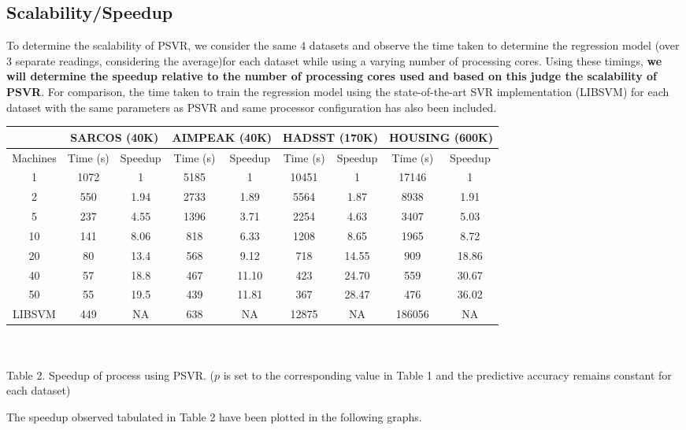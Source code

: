 \documentclass[12pt]{article}
\begin{document}
\subsection{Scalability/Speedup}
\label{Scalability/Speedup}
To determine the scalability of PSVR, we consider the same 4 datasets and observe the time taken to determine the regression model (over 3 separate readings, considering the average)for each dataset while using a varying number of processing cores. Using these timings, {\bf we will determine the speedup relative to the number of processing cores used and based on this judge the scalability of PSVR}. For comparison, the time taken to train the regression model using the state-of-the-art SVR implementation (LIBSVM) for each dataset with the same parameters as PSVR and same processor configuration has also been included. 
\begin{center}
\begin{tabular}{ |c|c|c|c|c|c|c|c|c| }
  \hline
   &  \multicolumn{2}{|c|}{SARCOS (40K)} &  \multicolumn{2}{|c|}{AIMPEAK (40K)} & \multicolumn{2}{|c|}{HADSST (170K)}  &  \multicolumn{2}{|c|}{HOUSING (600K)} \\
  \hline
  Machines & Time (s) & Speedup & Time (s) & Speedup & Time (s) & Speedup & Time (s) & Speedup\\
  \hline
  1 & 1072& 1& 5185 & 1&10451 & 1 &17146 & 1 \\
  2 & 550 & 1.94 & 2733 & 1.89 & 5564 & 1.87& 8938 &1.91  \\
  5 & 237 & 4.55 & 1396& 3.71 & 2254 & 4.63 & 3407 & 5.03  \\
  10 & 141& 8.06 & 818 & 6.33 & 1208 & 8.65 & 1965& 8.72\\
  20 & 80& 13.4 & 568 & 9.12& 718 & 14.55 & 909 &  18.86  \\
  40 & 57& 18.8 & 467 & 11.10& 423 & 24.70 & 559& 30.67  \\
  50 & 55 & 19.5 & 	439 & 11.81& 367 & 28.47 & 476 & 36.02 \\
  \hline
  LIBSVM & 449 & NA& 638 & NA & 12875 & NA &186056 & NA\\
  \hline
\end{tabular}
\ \\
\ \\
Table 2. Speedup of process using PSVR. ($p$ is set to the corresponding value in Table 1 and the predictive accuracy remains constant for each dataset)
\end{center}
The speedup observed tabulated in Table 2 have been plotted in the following graphs.
\newline\newline
\end{document}
